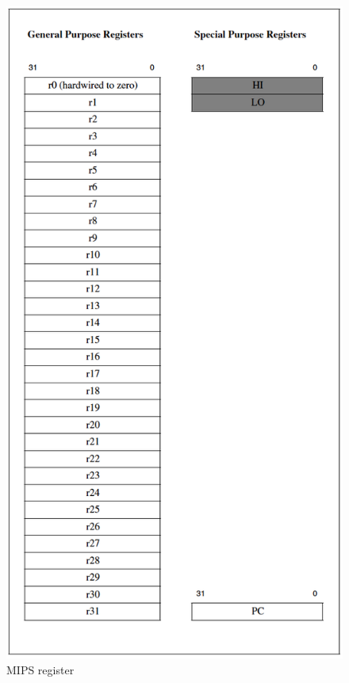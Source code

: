 \documentclass[
  oneside,
  11pt, a4paper,
  footinclude=true,
  headinclude=true,
  cleardoublepage=empty
]{scrbook}
\begin{document}
\begin{figure}[h!]
  \centering
    \includegraphics[scale=0.91]{img/mips_register.png}
    \caption{MIPS register}
    \label{fig:MIPS_register}
\end{figure}

\newpage
\end{document}
